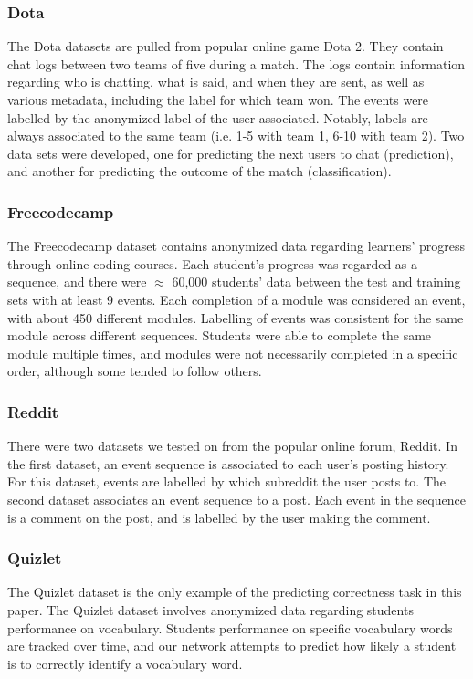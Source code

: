 \subsubsection{Dota}
The Dota datasets are pulled from popular online game Dota 2. They contain chat logs between two teams of five during a match. The logs contain information regarding who is chatting, what is said, and when they are sent, as well as various metadata, including the label for which team won. The events were labelled by the anonymized label of the user associated. Notably, labels are always associated to the same team (i.e. 1-5 with team 1, 6-10 with team 2). Two data sets were developed, one for predicting the next users to chat (prediction), and another for predicting the outcome of the match (classification).

\subsubsection{Freecodecamp}
The Freecodecamp dataset contains anonymized data regarding learners' progress through online coding courses. Each student's progress was regarded as a sequence, and there were $\approx$ 60,000 students' data between the test and training sets with at least 9 events. Each completion of a module was considered an event, with about 450 different modules. Labelling of events was consistent for the same module across different sequences. Students were able to complete the same module multiple times, and modules were not necessarily completed in a specific order, although some tended to follow others. 
\subsubsection{Reddit}
There were two datasets we tested on from the popular online forum, Reddit. In the first dataset, an event sequence is associated to each user's posting history. For this dataset, events are labelled by which subreddit the user posts to. The second dataset associates an event sequence to a post. Each event in the sequence is a comment on the post, and is labelled by the user making the comment. 
\subsubsection{Quizlet}
The Quizlet dataset is the only example of the predicting correctness task in this paper. The Quizlet dataset involves anonymized data regarding students performance on vocabulary. Students performance on specific vocabulary words are tracked over time, and our network attempts to predict how likely a student is to correctly identify a vocabulary word.
